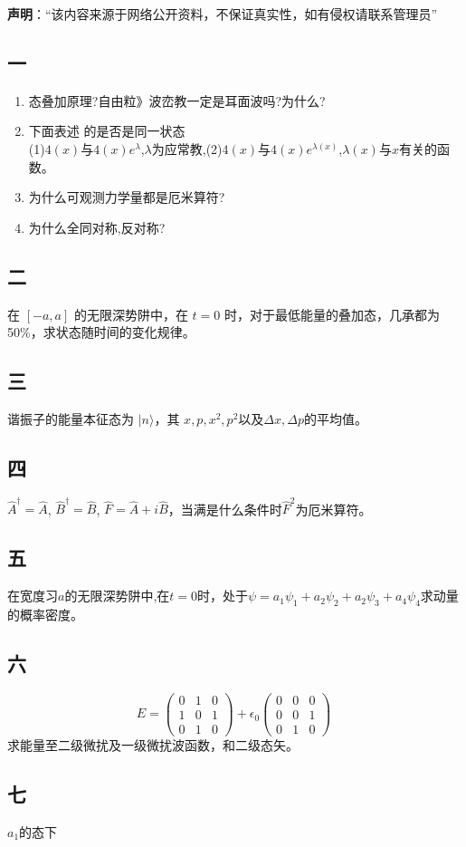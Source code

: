 
\textbf{声明}：“该内容来源于网络公开资料，不保证真实性，如有侵权请联系管理员”

\subsection{一}
\begin{enumerate}
\item 态叠加原理?自由粒》波峦教一定是耳面波吗?为什么?
\item 下面表述 的是否是同一状态\\
(1)$4(x)$与$4(x)e^\lambda$,$\lambda$为应常教,(2)$4(x)$与$4(x)e^{\lambda(x)}$,$\lambda(x)$与$x$有关的函数。
\item 为什么可观测力学量都是厄米算符?
\item 为什么全同对称,反对称?
\end{enumerate}
\subsection{二}
在 $[-a, a]$ 的无限深势阱中，在 $t=0$ 时，对于最低能量的叠加态，几承都为50\%，求状态随时间的变化规律。
\subsection{三}
谐振子的能量本征态为 $\lvert n \rangle$，其 $x,p,x^2,p^2$以及$\Delta x,\Delta p$的平均值。
\subsection{四}
 $\hat{A}^\dagger = \hat{A}$, $\hat{B}^\dagger = \hat{B}$, $\hat{F} = \hat{A} + i\hat{B}$，当满是什么条件时$\hat{F}^2$为厄米算符。
\subsection{五}
在宽度习$a$的无限深势阱中,在$t=0$时，处于$\psi=a_1\psi_1+a_2\psi_2+a_2\psi_3+a_4\psi_4$求动量的概率密度。
\subsection{六}
\[
E = 
\begin{pmatrix}
0 & 1 & 0 \\
1 & 0 & 1 \\
0 & 1 & 0
\end{pmatrix}
+ \epsilon_0 
\begin{pmatrix}
0 & 0 & 0 \\
0 & 0 & 1 \\
0 & 1 & 0
\end{pmatrix}~
\]
求能量至二级微扰及一级微扰波函数，和二级态矢。
\subsection{七}
$a_1$的态下